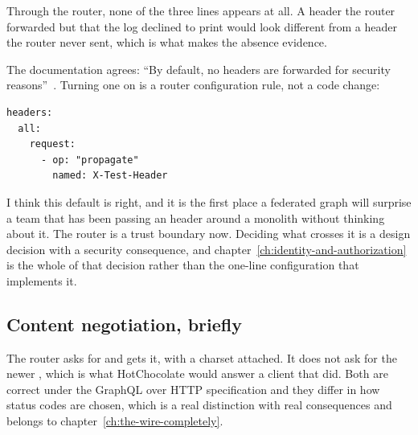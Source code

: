 Through the router, none of the three lines appears at all. A header the router
forwarded but that the log declined to print would look different from a header
the router never sent, which is what makes the absence evidence.

The documentation agrees: \enquote{By default, no headers are forwarded for
security reasons}~\autocite{cosmo2026headers}. Turning one on is a router
configuration rule, not a code change:

\begin{verbatim}
headers:
  all:
    request:
      - op: "propagate"
        named: X-Test-Header
\end{verbatim}

%
I think this default is right, and it is the first place a federated graph will
surprise a team that has been passing an  header around a
monolith without thinking about it. The router is a trust boundary now. Deciding
what crosses it is a design decision with a security consequence, and
chapter~\ref{ch:identity-and-authorization} is the whole of that decision rather
than the one-line configuration that implements it.

\subsection*{Content negotiation, briefly}

The router asks for  and gets it, with a charset
attached. It does not ask for the newer
, which is what HotChocolate would
answer a client that did. Both are correct under the GraphQL over HTTP
specification and they differ in how status codes are chosen, which is a real
distinction with real consequences and belongs to
chapter~\ref{ch:the-wire-completely}.

%
